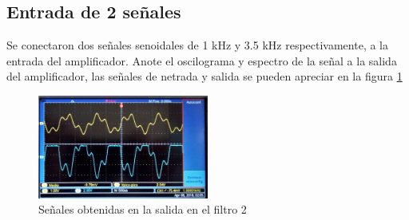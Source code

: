 \documentclass{article}
\begin{document}
\subsection{Entrada de 2 señales}

Se conectaron dos señales senoidales de 1 kHz y 3.5 kHz respectivamente, a la entrada del amplificador. Anote el oscilograma y espectro de la señal a la salida del amplificador, las señales de netrada y salida se pueden apreciar en la figura \ref{fig:SenialFiltro2}


\begin{figure}[h!]
    \centering
    \includegraphics[width=0.5\textwidth]{Imagenes/SistComDistAlin8.jpg}
    \caption{Señales obtenidas en la salida en el filtro 2}
    \label{fig:SenialFiltro2}
\end{figure}
\end{document}

